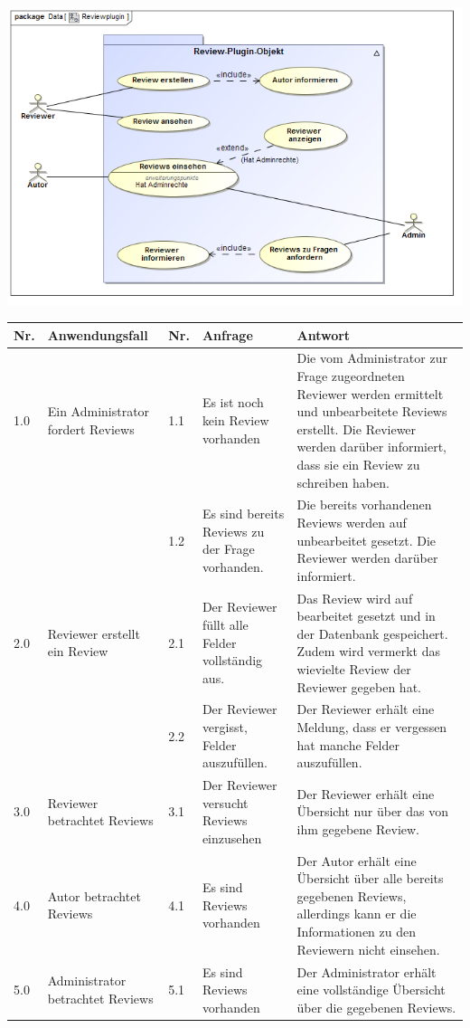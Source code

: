 \documentclass[a4paper]{scrreprt}
\begin{document}
\includegraphics[width=1.0\textwidth]{Use_Case_Diagram__Reviewplugin.png}
\label{Review}

\begin{tabular}{|p{0.5cm}|p{3cm}|p{0.5cm}|p{4cm}|p{4.5cm}|}\hline
Nr. & Anwendungsfall & Nr. & Anfrage & Antwort\\\hline
1.0 & Ein Administrator fordert Reviews & 1.1 & Es ist noch kein Review vorhanden & Die vom Administrator zur Frage zugeordneten Reviewer werden ermittelt und unbearbeitete Reviews erstellt. Die Reviewer werden darüber informiert, dass sie ein Review zu schreiben haben.\\\hline
&&1.2 & Es sind bereits Reviews zu der Frage vorhanden. & Die bereits vorhandenen Reviews werden auf unbearbeitet gesetzt. Die Reviewer werden darüber informiert.\\\hline
2.0 & Reviewer erstellt ein Review & 2.1 & Der Reviewer füllt alle Felder vollständig aus. & Das Review wird auf bearbeitet gesetzt und in der Datenbank gespeichert. Zudem wird vermerkt das wievielte Review der Reviewer gegeben hat.\\\hline
&&2.2 & Der Reviewer vergisst, Felder auszufüllen. & Der Reviewer erhält eine Meldung, dass er vergessen hat manche Felder auszufüllen. \\\hline
3.0 & Reviewer betrachtet Reviews & 3.1 & Der Reviewer versucht Reviews einzusehen & Der Reviewer erhält eine Übersicht nur über das von ihm gegebene Review. \\\hline
4.0 & Autor betrachtet Reviews & 4.1 & Es sind Reviews vorhanden & Der Autor erhält eine Übersicht über alle bereits gegebenen Reviews, allerdings kann er die Informationen zu den Reviewern nicht einsehen. \\\hline
5.0 & Administrator betrachtet Reviews & 5.1 & Es sind Reviews vorhanden & Der Administrator erhält eine vollständige Übersicht über die gegebenen Reviews. \\\hline
\end{tabular}
 
\end{document}
